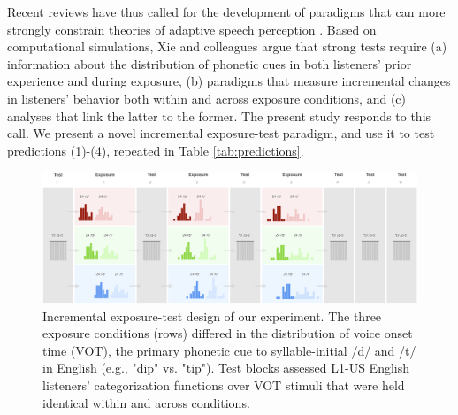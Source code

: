 \documentclass[
  11pt,
  man,mask,floatsintext]{apa6}
\begin{document}
Recent reviews have thus called for the development of paradigms that can more strongly constrain theories of adaptive speech perception \autocite{bent-baeseberk2021,coretta2023,schertz-clare2020,xie2023}. Based on computational simulations, Xie and colleagues argue that strong tests require (a) information about the distribution of phonetic cues in both listeners' prior experience and during exposure, (b) paradigms that measure incremental changes in listeners' behavior both within and across exposure conditions, and (c) analyses that link the latter to the former. The present study responds to this call. We present a novel incremental exposure-test paradigm, and use it to test predictions (1)-(4), repeated in Table \ref{tab:predictions}.

\begin{figure}[H]

{\centering \includegraphics[width=5.8in]{../figures/block_design} 

}

\caption{Incremental exposure-test design of our experiment. The three exposure conditions (rows) differed in the distribution of voice onset time (VOT), the primary phonetic cue to syllable-initial /d/ and /t/ in English (e.g., "dip" vs. "tip"). Test blocks assessed L1-US English listeners' categorization functions over VOT stimuli that were held identical within and across conditions.}\label{fig:block-design-figure}
\end{figure}
\end{document}
